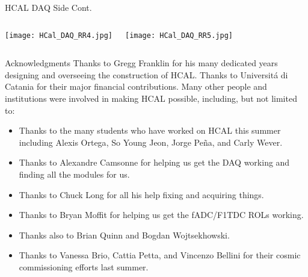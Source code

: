 \documentclass[10pt]{beamer}
\newcommand{\hcal}{HCAL}
\begin{document}
\begin{frame}{{\hcal} DAQ Side Cont.}

    \begin{columns}[T,onlytextwidth]
	\texttt{[image: HCal\_DAQ\_RR4.jpg]}
	
	\texttt{[image: HCal\_DAQ\_RR5.jpg]}
	\end{columns}

\end{frame}

\begin{frame}{Acknowledgments}
Thanks to \alert{Gregg Franklin} for his many dedicated years designing and overseeing the construction of {\hcal}. Thanks to \alert{Universit\'{a} di Catania} for their major financial contributions. Many other people and institutions were involved in making {\hcal} possible, including, but not limited to:
    \begin{itemize}
        \item Thanks to the many students who have worked on {\hcal} this summer including \alert{Alexis Ortega}, \alert{So Young Jeon}, \alert{Jorge Pe\~{n}a}, and \alert{Carly Wever}. 
        \item Thanks to \alert{Alexandre Camsonne} for helping us get the DAQ working and finding all the modules for us.
        \item Thanks to \alert{Chuck Long} for all his help fixing and acquiring things.
        \item Thanks to \alert{Bryan Moffit} for helping us get the fADC/F1TDC ROLs working.
        \item Thanks also to \alert{Brian Quinn} and \alert{Bogdan Wojtsekhowski}.
        \item Thanks to \alert{Vanessa Brio}, \alert{Cattia Petta}, and \alert{Vincenzo Bellini} for their cosmic commissioning efforts last summer.
    \end{itemize}

\end{frame}
\end{document}
